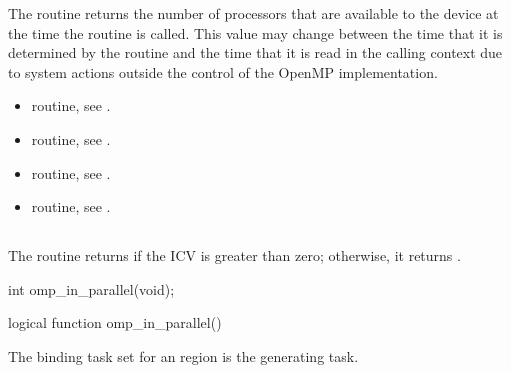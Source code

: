 \effect
The  routine returns the number of processors that are available
to the device at the time the routine is called. This value may change between
the time that it is determined by the  routine and the time that it
is read in the calling context due to system actions outside the control of the OpenMP
implementation.

\crossreferences

\begin{itemize}
\item {} routine, see
.

\item {} routine, see
.

\item {} routine, see
.

\item {} routine, see
.
\end{itemize}







\subsection{}
\label{subsec:omp_in_parallel}
\summary
The  routine returns  if the  ICV is greater
than zero; otherwise, it returns .

\format
\begin{ccppspecific}
\begin{ompcFunction}
int omp_in_parallel(void);
\end{ompcFunction}
\end{ccppspecific}

\begin{fortranspecific}
\begin{ompfFunction}
logical function omp_in_parallel()
\end{ompfFunction}
\end{fortranspecific}

\binding
The binding task set for an  region is the generating task.

